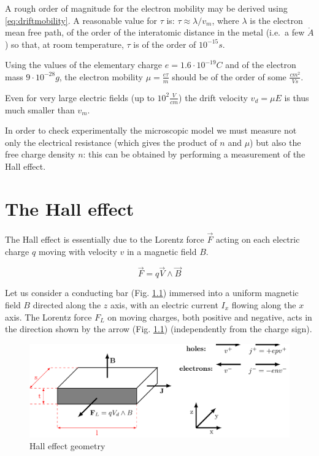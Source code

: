 \documentclass[]{book}
\begin{document}
A rough order of magnitude for the electron mobility may be derived
using \eqref{eq:driftmobility}. A reasonable value for \(\tau\) is:
\(\tau\approx\lambda/v_{m}\), where \(\lambda\) is the electron mean
free path, of the order of the interatomic distance in the metal (i.e.~a
few \(\mathring{A}\)) so that, at room temperature, \(\tau\) is of the
order of \(10^{-15}s\).

Using the values of the elementary charge \(e = 1.6 \cdot 10^{-19 }C\)
and of the electron mass \(9 \cdot 10^{-28} g\), the electron mobility
\(\mu=\frac{e\tau}{m}\) should be of the order of some
\(\frac{cm^2}{Vs}\).

Even for very large electric fields (up to \(10^2 \frac{V}{cm}\)) the
drift velocity \(v_d=\mu E\) is thus much smaller than \(v_{m}\).

In order to check experimentally the microscopic model we must measure
not only the electrical resistance (which gives the product of \(n\) and
\(\mu\)) but also the free charge density \(n\): this can be obtained by
performing a measurement of the Hall effect.

\chapter{The Hall effect}\label{the-hall-effect}

The Hall effect is essentially due to the Lorentz force \(\vec { F }\)
acting on each electric charge \(q\) moving with velocity \(v\) in a
magnetic field \(B\).

\begin{equation}
\vec { F } =q\vec { V } \wedge \vec { B }
\label{eq:lorentzForce}
\end{equation}

Let us consider a conducting bar (Fig. \ref{fig:hall-effect-geometry})
immersed into a uniform magnetic field \(B\) directed along the \(z\)
axis, with an electric current \(I_x\) flowing along the \(x\) axis. The
Lorentz force \(F_L\) on moving charges, both positive and negative,
acts in the direction shown by the arrow (Fig.
\ref{fig:hall-effect-geometry}) (independently from the charge sign).

\begin{figure}

{\centering \includegraphics[width=0.65\linewidth]{Assets/Figures/hall-effect-geometry} 

}

\caption{Hall effect geometry}\label{fig:hall-effect-geometry}
\end{figure}
\end{document}
